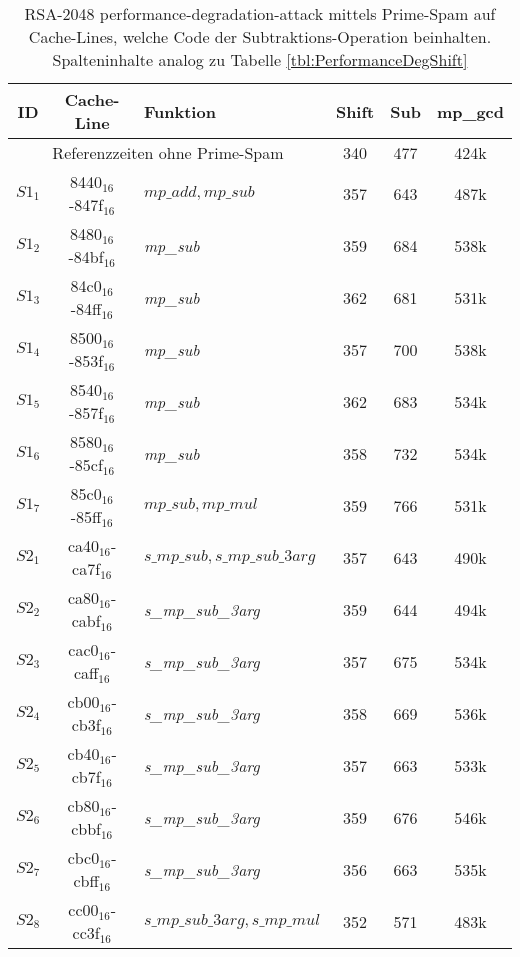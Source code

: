 \begin{table}[h]
\caption{RSA-2048 performance-degradation-attack mittels Prime-Spam auf Cache-Lines, welche Code der Subtraktions-Operation beinhalten.
Spalteninhalte analog zu Tabelle \ref{tbl:PerformanceDegShift}}
\label{tbl:PerformanceDegSub}
\begin{tabular}{cclccc}
\toprule
ID &Cache-Line & Funktion                     & Shift & Sub & mp\_gcd \\
\midrule
\multicolumn{3}{c}{Referenzzeiten ohne Prime-Spam}        & 340   & 477         & 424k    \\
$S1_1$ & 8440$_{16}$-847f$_{16}$  & $mp\_add, mp\_sub$             & 357   & 643         & 487k    \\
$S1_2$ & 8480$_{16}$-84bf$_{16}$  & \textit{mp_sub}                      & 359   & 684         & 538k    \\
$S1_3$ & 84c0$_{16}$-84ff$_{16}$  & \textit{mp_sub}                      & 362   & 681         & 531k    \\
$S1_4$ & 8500$_{16}$-853f$_{16}$  & \textit{mp_sub}                      & 357   & 700         & 538k    \\
$S1_5$ & 8540$_{16}$-857f$_{16}$  & \textit{mp_sub}                      & 362   & 683         & 534k    \\
$S1_6$ & 8580$_{16}$-85cf$_{16}$  & \textit{mp_sub}                      & 358   & 732         & 534k    \\
$S1_7$ & 85c0$_{16}$-85ff$_{16}$  & $mp\_sub, mp\_mul$            & 359   & 766         & 531k    \\
\midrule
$S2_1$ & ca40$_{16}$-ca7f$_{16}$  & $s\_mp\_sub, s\_mp\_sub\_3arg$ & 357   & 643         & 490k    \\
$S2_2$ & ca80$_{16}$-cabf$_{16}$  & \textit{s_mp_sub_3arg}             & 359   & 644         & 494k    \\
$S2_3$ & cac0$_{16}$-caff$_{16}$  & \textit{s_mp_sub_3arg}             & 357   & 675         & 534k    \\
$S2_4$ & cb00$_{16}$-cb3f$_{16}$  & \textit{s_mp_sub_3arg}            & 358   & 669         & 536k    \\
$S2_5$ & cb40$_{16}$-cb7f$_{16}$  & \textit{s_mp_sub_3arg}             & 357   & 663         & 533k    \\
$S2_6$ & cb80$_{16}$-cbbf$_{16}$  & \textit{s_mp_sub_3arg}             & 359   & 676         & 546k    \\
$S2_7$ & cbc0$_{16}$-cbff$_{16}$  & \textit{s_mp_sub_3arg}             & 356   & 663         & 535k    \\
$S2_8$ & cc00$_{16}$-cc3f$_{16}$  & $s\_mp\_sub\_3arg, s\_mp\_mul$ & 352   & 571         & 483k   \\
\bottomrule
\end{tabular}
\end{table}


